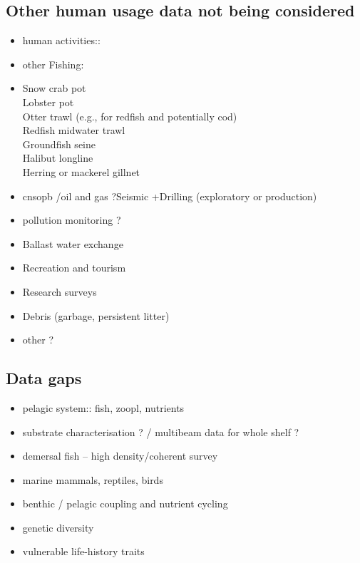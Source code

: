 \documentclass[letterpaper,portrait,11pt]{scrartcl}
\numberwithin{equation}{section}		%
\numberwithin{figure}{section}			%
\numberwithin{table}{section}				%
\begin{document}
\subsection{Other human usage data not being considered}
\begin{itemize}
  \item human activities::
  \item other Fishing: 
  \item Snow crab pot\\Lobster pot\\Otter trawl (e.g., for redfish and potentially cod)\\Redfish midwater trawl\\Groundfish seine\\Halibut longline\\Herring or mackerel gillnet 
  \item cnsopb /oil and gas ?Seismic +Drilling (exploratory or production) 
  \item pollution monitoring ?
  \item Ballast water exchange 
  \item Recreation and tourism
  \item Research surveys
  \item Debris (garbage, persistent litter) 
  \item other ?
\end{itemize}	
  
\subsection{Data gaps}
\begin{itemize}
  \item pelagic system:: fish, zoopl, nutrients 
  \item substrate characterisation ?  / multibeam data for whole shelf ?
  \item demersal fish -- high density/coherent survey
  \item marine mammals, reptiles, birds
  \item benthic / pelagic coupling and nutrient cycling
  \item genetic diversity 
  \item vulnerable life-history traits
  
\end{itemize}	
\end{document}
